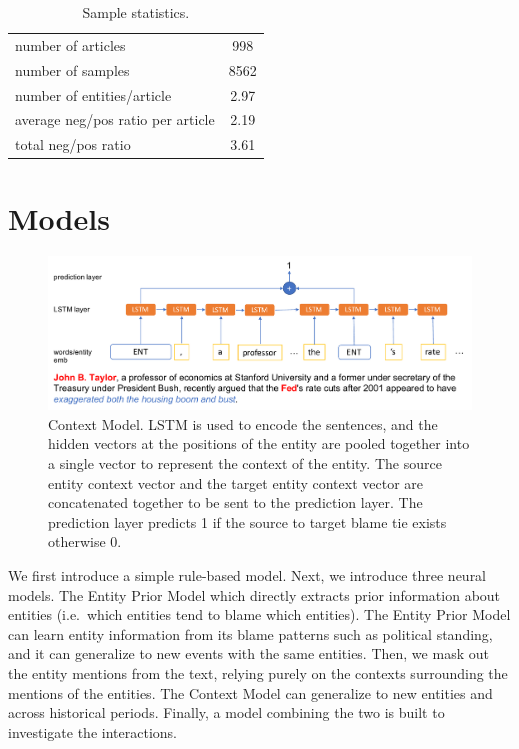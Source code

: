 \documentclass[letterpaper]{article} %
\begin{document}
\begin{table}[t]
\centering
\begin{tabular}{l c} 
 \hline
 number of articles & 998 \\ 
 number of samples & 8562 \\
 number of entities/article & 2.97 \\
 average neg/pos ratio per article & 2.19 \\
 total neg/pos ratio & 3.61 \\
 \hline
\end{tabular}
\caption{Sample statistics.}
\label{table:samplestats}
\end{table}

\section{Models}

\begin{figure}[t!] 
  \centering 
  \includegraphics[width=\textwidth]{contextmodel.pdf}
  \caption{Context Model. LSTM is used to encode the sentences, and the hidden vectors at the positions of the entity are pooled together into a single vector to represent the context of the entity. The source entity context vector and the target entity context vector are concatenated together to be sent to the prediction layer. The prediction layer predicts 1 if the source to target blame tie exists otherwise 0.}
  \label{figure:contextmodel}
\end{figure}

We first introduce a simple rule-based model. Next, we introduce three neural models. The Entity Prior Model which directly extracts prior information about entities (i.e.\ which entities tend to blame which entities). The Entity Prior Model can learn entity information from its blame patterns such as political standing, and it can generalize to new events with the same entities. Then, we mask out the entity mentions from the text, relying purely on the contexts surrounding the mentions of the entities. The Context Model can generalize to new entities and across historical periods. Finally, a model combining the two is built to investigate the interactions.
\end{document}
